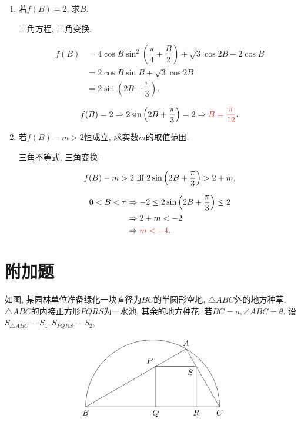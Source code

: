 \documentclass[8pt]{article}
\begin{document}
		\begin{enumerate}[label=(\arabic*)]
			\item 若$f(B)=2$, 求$B$.

				三角方程, 三角变换.

				\begin{align*}
					f(B) &= 4\cos B \sin^2 \left(\dfrac{\pi}{4}+\dfrac{B}{2}\right) + \sqrt{3} \cos 2B - 2 \cos B\\
					     &= 2 \cos B \sin B + \sqrt{3} \cos 2B\\
					     &= 2\sin \left(2B + \dfrac{\pi}{3}\right).
				\end{align*}

				$$f(B) = 2 \Rightarrow 2\sin \left(2B + \dfrac{\pi}{3}\right) = 2 \Rightarrow \ansmath{B = \dfrac{\pi}{12}}.$$

			\item 若$f(B)-m > 2$恒成立, 求实数$m$的取值范围.

				三角不等式, 三角变换.

				$$f(B)-m>2 \text{ iff } 2\sin \left(2B + \dfrac{\pi}{3}\right) > 2+m,$$

				\begin{align*}
					0 < B < \pi &\Rightarrow -2 \leq 2\sin \left(2B + \dfrac{\pi}{3}\right) \leq 2\\
					&\Rightarrow 2+m < -2\\
					&\Rightarrow \ansmath{m<-4}.
				\end{align*}

		\end{enumerate}

	\section{附加题}
		如图, 某园林单位准备绿化一块直径为$BC$的半圆形空地, $\triangle ABC$外的地方种草, $\triangle ABC$的内接正方形$PQRS$为一水池, 其余的地方种花. 若$BC=a, \angle ABC=\theta$. 设$S_{\triangle ABC} = S_1, S_{PQRS} = S_2$,

		$$
			\begin{tikzpicture}[scale = 1, baseline = 0]
				\draw[black] ({(3 + sqrt(3) + 1)}, 0) arc[start angle = 0, end angle = 180, radius = {(3 + sqrt(3) + 1) / 2}];
				\draw[black] (0, 0) -- ({(3 + sqrt(3) + 1)}, 0) node at (0, 0) [anchor = north] {$B$} node at ({(3 + sqrt(3) + 1)}, 0) [anchor = north] {$C$};
				\draw[black] (3, 0) -- (3, {sqrt(3)}) -- ({3 + sqrt(3)}, {sqrt(3)}) -- ({3 + sqrt(3)}, {0}) node at (3, 0) [anchor = north] {$Q$} node at ({3 + sqrt(3)}, 0) [anchor = north] {$R$};
				\draw[black] (0, 0) -- ({3 * (3 + sqrt(3) + 1) / 4}, {sqrt(3) * (3 + sqrt(3) + 1) / 4}) -- ({(3 + sqrt(3) + 1)}, 0) node at ({3 * (3 + sqrt(3) + 1) / 4}, {sqrt(3) * (3 + sqrt(3) + 1) / 4}) [anchor = south] {$A$} node at (3, {sqrt(3)}) [anchor = south east] {$P$} node at ({3 + sqrt(3)}, {sqrt(3)}) [anchor = north east] {$S$};
			\end{tikzpicture}
		$$
\end{document}
